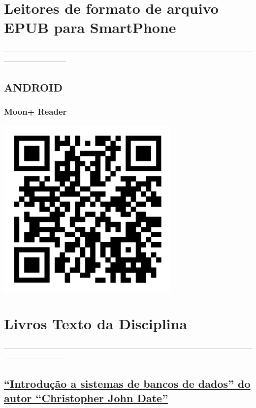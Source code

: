 \documentclass[
]{book}
\theoremstyle{definition}
\theoremstyle{definition}
\theoremstyle{definition}
\theoremstyle{definition}
\theoremstyle{remark}
\begin{document}
\section{Leitores de formato de arquivo EPUB para SmartPhone}\label{leitores-de-formato-de-arquivo-epub-para-smartphone}

---------------------------------------------------------------------------------------------------------------------------------------

\subsection{ANDROID}\label{android}

\subsubsection{\texorpdfstring{\textbf{Moon+ Reader}}{Moon+ Reader}}\label{moon-reader}

\includegraphics[width=3.54167in,height=\textheight]{images/qrcode/leitor_epub/MoonReaderPlus.jpg}

\section{Livros Texto da Disciplina}\label{livros-texto-da-disciplina}

---------------------------------------------------------------------------------------------------------------------------------------

\subsection{\texorpdfstring{\href{https://www.kufunda.net/publicdocs/Introdu\%C3\%A7\%C3\%A3o\%20a\%20Sistemas\%20de\%20Bancos\%20de\%20Dados\%20(C.\%20J.\%20Date)\%20(z-lib.org).pdf}{``Introdução a sistemas de bancos de dados'' do autor ``\textbf{Christopher John Date}''}}{``Introdução a sistemas de bancos de dados'' do autor ``Christopher John Date''}}\label{introduuxe7uxe3o-a-sistemas-de-bancos-de-dados-do-autor-christopher-john-date}
\end{document}
